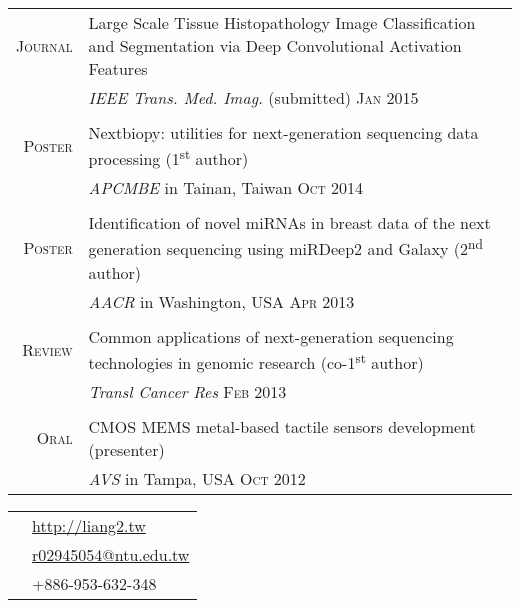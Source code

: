 \documentclass[10pt, a4paper]{article} %
\begin{document}
{\begin{minipage}[t]{0.5\textwidth}
\begin{tabular}{rp{7.5cm}}
\textsc{Journal}
& Large Scale Tissue Histopathology Image Classification and Segmentation via Deep Convolutional Activation Features\\
& \textit{IEEE Trans. Med. Imag.} \hfill (submitted) \textsc{Jan 2015}\\
& \\
\textsc{Poster}
& Nextbiopy: utilities for next-generation sequencing data processing (1\textsuperscript{st} author)\\
& \textit{APCMBE} in Tainan, Taiwan \hfill \textsc{Oct 2014}\\
& \\
\textsc{Poster}
& Identification of novel miRNAs in breast data of the next generation sequencing using miRDeep2 and Galaxy (2\textsuperscript{nd} author)\\
& \textit{AACR} in Washington, USA \hfill \textsc{Apr 2013}\\
& \\
\textsc{Review}
& Common applications of next-generation sequencing technologies in genomic research (co-1\textsuperscript{st} author) \\
& \textit{Transl Cancer Res} \hfill \textsc{Feb 2013} \\
& \\
\textsc{Oral}
& CMOS MEMS metal-based tactile sensors development (presenter) \\
& \textit{AVS} in Tampa, USA \hfill \textsc{Oct 2012}\\
\end{tabular}



\end{minipage} %
\hfill
\begin{minipage}[t]{0.44\textwidth} %
\vspace{0pt} %


\colorbox{shade}{\textcolor{text1}{
\begin{tabular}{c|p{7cm}}
\raisebox{-2pt}{\large \Mundus} & \href{http://liang2.tw}{http://liang2.tw} \\ %
\raisebox{-1pt}{\large \Letter} & \href{mailto:r02945054@ntu.edu.tw}{r02945054@ntu.edu.tw} \\ %
\raisebox{-1pt}{\large \Mobilefone} & +886-953-632-348 \\ %
\end{tabular}
}
}\\[10pt]


\end{minipage}}
\end{document}
